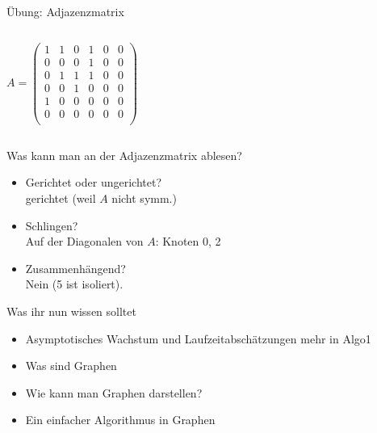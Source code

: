 

\begin{frame}{Übung: Adjazenzmatrix}
	\begin{columns}
		$$ A = 
		\begin{pmatrix} 
		1 & 1 & 0 & 1 & 0 & 0 \\ 
		0 & 0 & 0 & 1 & 0 & 0 \\ 
		0 & 1 & 1 & 1 & 0 & 0 \\ 
		0 & 0 & 1 & 0 & 0 & 0 \\
		1 & 0 & 0 & 0 & 0 & 0 \\
		0 & 0 & 0 & 0 & 0 & 0 \\
		\end{pmatrix} $$
		
	\end{columns}
	
	\bigskip
	Was kann man an der Adjazenzmatrix ablesen?
	\begin{itemize}
		\item Gerichtet oder ungerichtet? \\ \pause
		\impl gerichtet (weil $A$ nicht symm.) \pause
		\item Schlingen? \\ \pause
		\impl Auf der Diagonalen von $A$: \quad Knoten 0, 2 \pause
		\item Zusammenhängend? \\ \pause
		\impl Nein (5 ist isoliert). 
	\end{itemize}
\end{frame}




\begin{frame}	
	\begin{block}{Was ihr nun wissen solltet}
		\begin{itemize}
			\item Asymptotisches Wachstum und Laufzeitabschätzungen \impl mehr in Algo1
			\item Was sind Graphen
			\item Wie kann man Graphen darstellen?
			\item Ein einfacher Algorithmus in Graphen
		\end{itemize}
	\end{block}

\end{frame}


{}

\slideThanks

